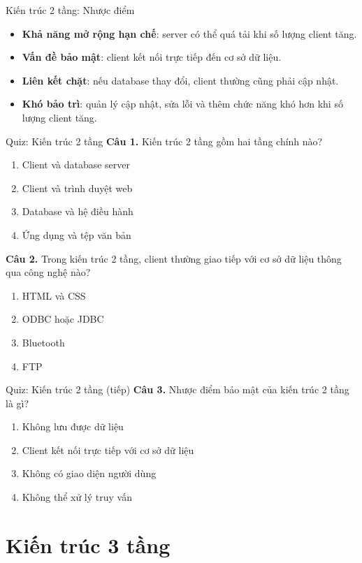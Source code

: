 \documentclass[aspectratio=169,11pt]{beamer}
\newcommand{\keyword}[1]{\textcolor{accent}{\textbf{#1}}}
\newcommand{\tightlist}{\setlength{\itemsep}{2pt}\setlength{\parskip}{0pt}}
\newcommand{\qoption}[2]{\item[#1.] #2}
\begin{document}
\begin{frame}{Kiến trúc 2 tầng: Nhược điểm}
\small
\begin{itemize}
\tightlist
  \item \keyword{Khả năng mở rộng hạn chế}: server có thể quá tải khi số lượng client tăng.
  \item \keyword{Vấn đề bảo mật}: client kết nối trực tiếp đến cơ sở dữ liệu.
  \item \keyword{Liên kết chặt}: nếu database thay đổi, client thường cũng phải cập nhật.
  \item \keyword{Khó bảo trì}: quản lý cập nhật, sửa lỗi và thêm chức năng khó hơn khi số lượng client tăng.
\end{itemize}
\end{frame}

\begin{frame}{Quiz: Kiến trúc 2 tầng}
\small
\textbf{Câu 1.} Kiến trúc 2 tầng gồm hai tầng chính nào?
\begin{enumerate}
\tightlist
  \qoption{A}{Client và database server}
  \qoption{B}{Client và trình duyệt web}
  \qoption{C}{Database và hệ điều hành}
  \qoption{D}{Ứng dụng và tệp văn bản}
\end{enumerate}

\textbf{Câu 2.} Trong kiến trúc 2 tầng, client thường giao tiếp với cơ sở dữ liệu thông qua công nghệ nào?
\begin{enumerate}
\tightlist
  \qoption{A}{HTML và CSS}
  \qoption{B}{ODBC hoặc JDBC}
  \qoption{C}{Bluetooth}
  \qoption{D}{FTP}
\end{enumerate}
\end{frame}

\begin{frame}{Quiz: Kiến trúc 2 tầng (tiếp)}
\small
\textbf{Câu 3.} Nhược điểm bảo mật của kiến trúc 2 tầng là gì?
\begin{enumerate}
\tightlist
  \qoption{A}{Không lưu được dữ liệu}
  \qoption{B}{Client kết nối trực tiếp với cơ sở dữ liệu}
  \qoption{C}{Không có giao diện người dùng}
  \qoption{D}{Không thể xử lý truy vấn}
\end{enumerate}
\end{frame}

\section{Kiến trúc 3 tầng}
\end{document}

